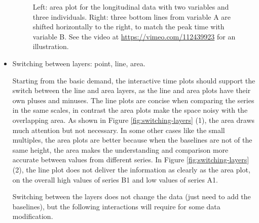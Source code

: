 \documentclass[12pt]{article}
\begin{document}
\begin{itemize}
\begin{center}
\begin{figure}[H]
\caption{\label{fig:x-shifting}Left: area plot for the longitudinal data with
two variables and three individuals. Right: three bottom lines from
variable A are shifted horizontally to the right, to match the peak
time with variable B. See the video at \url{https://vimeo.com/112439923} for an illustration.}
\end{figure}

\par\end{center}


\item Switching between layers: point, line, area.

Starting from the basic demand, the interactive time plots should
support the switch between the line and area layers, as the line and
area plots have their own pluses and minuses. The line plots are concise
when comparing the series in the same scales, in contrast the area
plots make the space noisy with the overlapping area. As shown in
Figure \ref{fig:switching-layers} (1), the area draws much attention
but not necessary. In some other cases like the small multiples, the
area plots are better because when the baselines are not of the same
height, the area makes the understanding and comparison more accurate
between values from different series. In Figure \ref{fig:switching-layers} (2),
the line plot does not deliver the information as clearly as the area
plot, on the overall high values of series B1 and low values of series
A1.

Switching between the layers does not change the data  (just need to
add the baselines), but the following interactions will require for
some data modification.


\end{itemize}
\end{document}
